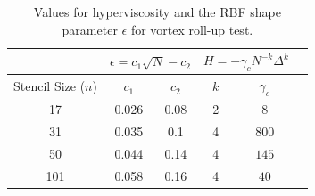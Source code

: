 \begin{table}[t]
\caption{Values for hyperviscosity and the RBF shape parameter $\epsilon$ for vortex roll-up test.}
\begin{center}
\begin{tabular}{|c|c|c|c|c|c|}
\hline		     & \multicolumn{2}{c|}{$\epsilon = c_1 \sqrt{N} - c_2$} & \multicolumn{2}{c|}{$H = -\gamma_{c} N^{-k} \Delta^{k}$ } \\ \hline
Stencil Size ($n$) & $c_{1}$ & $c_{2}$ & $k$ & $\gamma_c$ \\ \hline
17 & 0.026 & 0.08 & 2 & $8$ \\
31 & 0.035 & 0.1  & 4 & $800$ \\
50 & 0.044 & 0.14 & 4 & $145$ \\
101 & 0.058 & 0.16 & 4 & $40$ \\ \hline
\end{tabular}
\end{center}
\label{tbl:vortex_hv_params}
\end{table}



